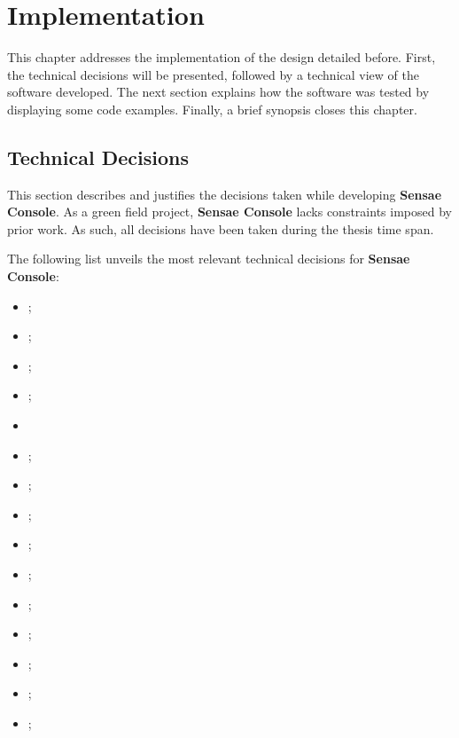 \chapter{Implementation}
\label{chap:implementation}

This chapter addresses the implementation of the design detailed before. First, the technical decisions will be presented, followed by a technical view of the software developed. The next section explains how the software was tested by displaying some code examples. Finally, a brief synopsis closes this chapter.

\section{Technical Decisions}
\label{sec:implementation:decisions}

This section describes and justifies the decisions taken while developing \textbf{Sensae Console}.
As a green field project, \textbf{Sensae Console} lacks constraints imposed by prior work. As such, all decisions have been taken during the thesis time span.

The following list unveils the most relevant technical decisions for \textbf{Sensae Console}:

\begin{itemize}
    \item {};
    \item {};
    \item {};
    \item {};
    \item {}
    \item {};
    \item {};
    \item {};
    \item {};
    \item {};
    \item {};
    \item {};
    \item {};
    \item {};
    \item {};
\end{itemize}

